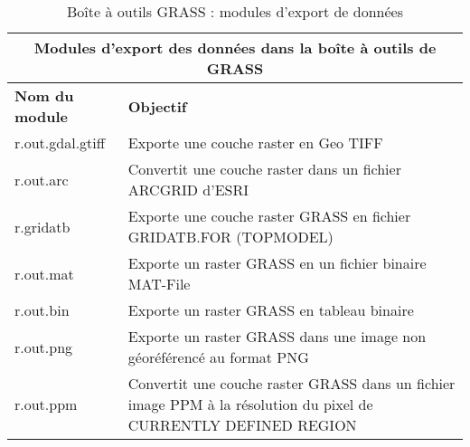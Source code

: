 \begin{table}[ht]
\centering
\caption{Bo\^ite \`a outils GRASS : modules d'export de donn\'ees}\medskip
 \begin{tabular}{|p{4cm}|p{12cm}|}
  \hline \multicolumn{2}{|c|}{\textbf{Modules d'export des donn\'ees dans la bo\^ite \`a outils de GRASS}} \\
  \hline \textbf{Nom du module} & \textbf{Objectif} \\
  \hline r.out.gdal.gtiff & Exporte une couche raster en Geo TIFF \\
  \hline r.out.arc & Convertit une couche raster dans un fichier ARCGRID d'ESRI \\
  \hline r.gridatb & Exporte une couche raster GRASS en fichier GRIDATB.FOR (TOPMODEL) \\
  \hline r.out.mat & Exporte un raster GRASS en un fichier binaire MAT-File \\
  \hline r.out.bin & Exporte un raster GRASS en tableau binaire \\
  \hline r.out.png & Exporte un raster GRASS dans une image non g\'eor\'ef\'erenc\'e au format PNG \\
  \hline r.out.ppm & Convertit une couche raster GRASS dans un fichier image PPM \`a la r\'esolution du pixel de CURRENTLY DEFINED REGION \\

\end{tabular}
\end{table}
